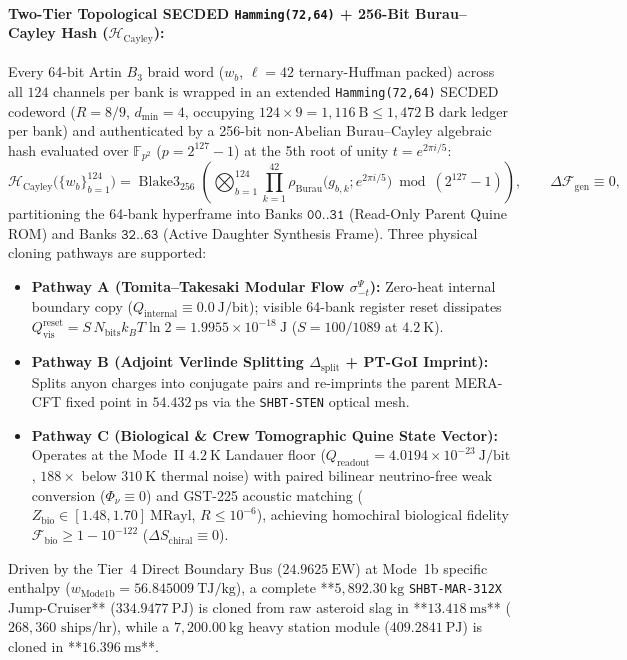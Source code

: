 \documentclass[11pt,onecolumn]{article}
\begin{document}
\paragraph{Two-Tier Topological SECDED \texttt{Hamming(72,64)} + 256-Bit Burau--Cayley Hash ($\mathcal{H}_{\text{Cayley}}$):}
Every 64-bit Artin $B_3$ braid word ($w_b$, $\ell = 42$ ternary-Huffman packed) across all $124$ channels per bank is wrapped in an extended \texttt{Hamming(72,64)} SECDED codeword ($R = 8/9$, $d_{\min} = 4$, occupying $124 \times 9 = 1{,}116~\text{B} \le 1{,}472~\text{B}$ dark ledger per bank) and authenticated by a 256-bit non-Abelian Burau--Cayley algebraic hash evaluated over $\mathbb{F}_{p^2}$ ($p = 2^{127}-1$) at the 5th root of unity $t = e^{2\pi i/5}$:
\begin{equation}
\mathcal{H}_{\text{Cayley}}\big(\{w_b\}_{b=1}^{124}\big) = \operatorname{ Blake3}_{256}\!\left(\bigotimes_{b=1}^{124} \prod_{k=1}^{42} \rho_{\text{Burau}}\big(g_{b,k}; e^{2\pi i/5}\big) \bmod (2^{127}-1)\right), \qquad \Delta\mathcal{F}_{\text{gen}} \equiv 0,
\label{eq:burau_cayley_hash}
\end{equation}
partitioning the 64-bank hyperframe into Banks $\texttt{00..31}$ (Read-Only Parent Quine ROM) and Banks $\texttt{32..63}$ (Active Daughter Synthesis Frame). Three physical cloning pathways are supported:
\begin{itemize}
    \item \textbf{Pathway A (Tomita--Takesaki Modular Flow $\sigma_{-t}^\Psi$):} Zero-heat internal boundary copy ($Q_{\text{internal}} \equiv 0.0~\text{J/bit}$); visible 64-bank register reset dissipates $Q_{\text{vis}}^{\text{reset}} = S\,N_{\text{bits}} k_B T \ln 2 = 1.9955\times 10^{-18}~\text{J}$ ($S = 100/1089$ at $4.2~\text{K}$).
    \item \textbf{Pathway B (Adjoint Verlinde Splitting $\Delta_{\text{split}}$ + PT-GoI Imprint):} Splits anyon charges into conjugate pairs and re-imprints the parent MERA-CFT fixed point in $54.432~\text{ps}$ via the \texttt{SHBT-STEN} optical mesh.
    \item \textbf{Pathway C (Biological \& Crew Tomographic Quine State Vector):} Operates at the Mode~II $4.2~\text{K}$ Landauer floor ($Q_{\text{readout}} = 4.0194\times 10^{-23}~\text{J/bit}$, $188\times$ below $310~\text{K}$ thermal noise) with paired bilinear neutrino-free weak conversion ($\Phi_\nu \equiv 0$) and GST-225 acoustic matching ($Z_{\text{bio}} \in [1.48, 1.70]~\text{MRayl}$, $R \le 10^{-6}$), achieving homochiral biological fidelity $\mathcal{F}_{\text{bio}} \ge 1 - 10^{-122}$ ($\Delta S_{\text{chiral}} \equiv 0$).
\end{itemize}
Driven by the Tier~4 Direct Boundary Bus ($24.9625~\text{EW}$) at Mode~1b specific enthalpy ($w_{\text{Mode1b}} = 56.845009~\text{TJ/kg}$), a complete **$5{,}892.30~\mathrm{kg}$ \texttt{SHBT-MAR-312X} Jump-Cruiser** ($334.9477~\text{PJ}$) is cloned from raw asteroid slag in **$13.418~\mathrm{ms}$** ($268{,}360\text{ ships/hr}$), while a $7{,}200.00~\mathrm{kg}$ heavy station module ($409.2841~\text{PJ}$) is cloned in **$16.396~\mathrm{ms}$**.
\end{document}
